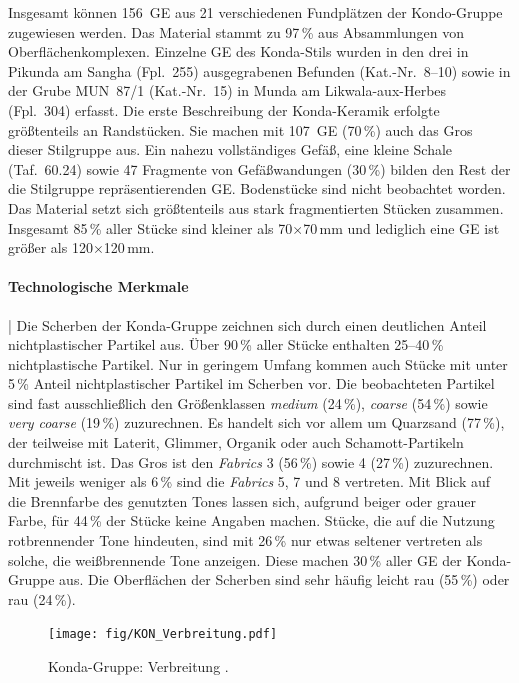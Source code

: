 Insgesamt können 156~GE aus 21 verschiedenen Fundplätzen der Kondo-Gruppe zugewiesen werden. Das Material stammt zu 97\,\% aus Absammlungen von Oberflächenkomplexen. Einzelne GE des Konda-Stils wurden in den drei in Pikunda am \mbox{Sangha} (Fpl.~255) ausgegrabenen Befunden (Kat.-Nr.~8--10) sowie in der Grube MUN~87/1 (Kat.-Nr.~15) in Munda am \mbox{Likwala}-\mbox{aux}-\mbox{Herbes} (Fpl.~304) erfasst. Die erste Beschreibung der Konda-Keramik erfolgte größtenteils an Randstücken. Sie machen mit 107~GE (70\,\%) auch das Gros dieser Stilgruppe aus. Ein nahezu vollständiges Gefäß, eine kleine Schale (Taf.~60.24) sowie 47 Fragmente von Gefäßwandungen (30\,\%) bilden den Rest der die Stilgruppe repräsentierenden GE. Bodenstücke sind nicht beobachtet worden. Das Material setzt sich größtenteils aus stark fragmentierten Stücken zusammen. Insgesamt 85\,\% aller Stücke sind kleiner als 70$\times$70\,mm und lediglich eine GE ist größer als 120$\times$120\,mm.


\paragraph{Technologische Merkmale}\hspace{-.5em}|\hspace{.5em}%
Die Scherben der Konda-Gruppe zeichnen sich durch einen deutlichen Anteil nichtplastischer Partikel aus. Über 90\,\% aller Stücke enthalten 25--40\,\% nichtplastische Partikel. Nur in geringem Umfang kommen auch Stücke mit unter 5\,\% Anteil nichtplastischer Partikel im Scherben vor. Die beobachteten Partikel sind fast ausschließlich den Größenklassen \textit{medium} (24\,\%), \textit{coarse} (54\,\%) sowie \textit{very coarse} (19\,\%) zuzurechnen. Es handelt sich vor allem um Quarzsand (77\,\%), der teilweise mit Laterit, Glimmer, Organik oder auch Schamott-Partikeln durchmischt ist. Das Gros ist den \textit{Fabrics} 3 (56\,\%) sowie 4 (27\,\%) zuzurechnen. Mit jeweils weniger als 6\,\% sind die \textit{Fabrics} 5, 7 und 8 vertreten. Mit Blick auf die Brennfarbe des genutzten Tones lassen sich, aufgrund beiger oder grauer Farbe, für 44\,\% der Stücke keine Angaben machen. Stücke, die auf die Nutzung rotbrennender Tone hindeuten, sind mit 26\,\% nur etwas seltener vertreten als solche, die weißbrennende Tone anzeigen. Diese machen 30\,\% aller GE der Konda-Gruppe aus. Die Oberflächen der Scherben sind sehr häufig leicht rau (55\,\%) oder rau (24\,\%).

\begin{figure}[p]
	\centering
	\texttt{[image: fig/KON\_Verbreitung.pdf]}
	\caption{Konda-Gruppe: Verbreitung \parencite[grau nach][510 Abb.~3]{Eggert.2002}.}
	\label{fig:KON_Verbreitung}
\end{figure}

